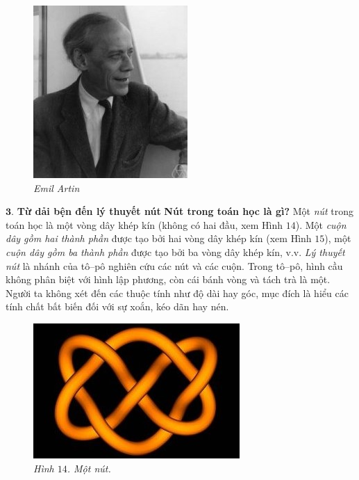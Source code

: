 \begin{multicols}{2}
\begin{figure}[H]
		\centering
		\captionsetup{labelformat= empty, justification=centering}
		\includegraphics[width= 0.47\linewidth]{fig_Artin}
		\caption{\small\textit{\color{duongvaotoanhoc}Emil Artin}}
		\vspace*{-10pt}
	\end{figure}
	$\pmb{3.}$ \textbf{\color{duongvaotoanhoc}Từ dải bện đến lý thuyết nút}
	\vskip 0.1cm
	\textbf{\color{duongvaotoanhoc}Nút trong toán học là gì?}
	\vskip 0.1cm
	Một \textit{nút} trong toán học là một vòng dây khép kín (không có hai đầu, xem Hình $14$). Một \textit{cuộn dây gồm hai thành phần} được tạo bởi hai vòng dây khép kín (xem Hình $15$), một \textit{cuộn dây gồm ba thành phần} được tạo bởi ba vòng dây khép kín, v.v. \textit{Lý thuyết nút} là nhánh của tô--pô nghiên cứu các nút và các cuộn. Trong tô--pô, hình cầu không phân biệt với hình lập phương, còn cái bánh vòng và tách trà là một. Người ta không xét đến các thuộc tính như độ dài hay góc, mục đích là hiểu các tính chất bất biến đối với sự xoắn, kéo dãn hay nén.
	\begin{figure}[H]
		\vspace*{-10pt}
		\centering
		\captionsetup{labelformat= empty, justification=centering}
		\includegraphics[width= 0.47\linewidth]{fig_14}
		\caption{\small\textit{\color{duongvaotoanhoc}Hình $14$. Một nút.}}
		\vspace*{-10pt}
	\end{figure}
	\begin{figure}[H]

\end{figure}
\end{multicols}
